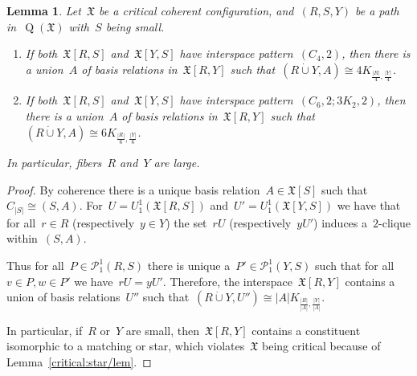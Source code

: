 \documentclass[english,a4paper]{article}
\theoremstyle{plain}
\newtheorem{lemma}      [theorem]{Lemma}
\theoremstyle{definition}
\newcommand{\abs}[1]{| #1 |}
\newcommand{\disjointUnion}{\ensuremath{\mathbin{\dot{\cup}}}}
\newcommand{\coherentConfig}{\ensuremath{\mathfrak{X}}}
\newcommand{\interspace}[2]{\ensuremath{\coherentConfig[#1,#2]}}
\newcommand{\inducedCC}[1]{\ensuremath{\coherentConfig[#1]}}
\newcommand{\arcs}{\ensuremath{A}}
\DeclareMathOperator*{\Quotient}{Q}
\newcommand{\quotientGraph}[1]{\ensuremath{\Quotient(#1)}}
\newcommand{\partition}[1]{\ensuremath{\mathcal{P}^1_1(#1)}}
\newcommand{\ipfourCycle}   {\ensuremath{(\cycle{4},2)}}
\newcommand{\ipsixMatchingAndCycle}     {\ensuremath{(\cycle{6},2;\disjointCliques{3}{2},2)}}
\newcommand{\clique}[1]{\ensuremath{K_{#1}}}
\newcommand{\cycle}[1]{\ensuremath{C_{#1}}}
\newcommand{\disjointCliques}[2]{\ensuremath{#1 \clique{#2}}}
\begin{document}
\begin{lemma}
    \label{critical:adjacent-interspace-cycle/lem}
    Let~$\coherentConfig$ be a critical coherent configuration, and~$(R,S,Y)$ be a path in~$\quotientGraph{\coherentConfig}$ with~$S$ being small.
    \begin{enumerate}
        \item If both~$\interspace{R}{S}$ and~$\interspace{Y}{S}$ have interspace pattern~$\ipfourCycle$, then there is a union~$\arcs$ of basis relations in~$\interspace{R}{Y}$ such that~$(R \disjointUnion Y,\arcs) \cong \disjointCliques{4}{\frac{\abs{R}}{4},\frac{\abs{Y}}{4}}$.
        \item If both~$\interspace{R}{S}$ and~$\interspace{Y}{S}$ have interspace pattern~$\ipsixMatchingAndCycle$, then there is a union~$\arcs$ of basis relations in~$\interspace{R}{Y}$ such that $(R \disjointUnion Y,\arcs) \cong \disjointCliques{6}{\frac{\abs{R}}{6},\frac{\abs{Y}}{6}}$.
    \end{enumerate}
    In particular, fibers~$R$ and~$Y$ are large.
\end{lemma}
\begin{proof}
    By coherence there is a unique basis relation~$\arcs \in \inducedCC{S}$ such that~$\cycle{\abs{S}} \cong (S,\arcs)$.
    For~$U = U^1_1(\interspace{R}{S})$ and~$U' = U^1_1( \interspace{Y}{S})$ we have that for all~$r \in R$ (respectively~$y \in Y$) the set~$r U$ (respectively~$y U'$) induces a~$2$-clique within~$(S,\arcs)$.

    Thus for all~$P \in \partition{R,S}$ there is unique a~$P' \in \partition{Y,S}$ such that for all~$v \in P, w \in P'$ we have~$r U = y U'$.
    Therefore, the interspace~$\interspace{R}{Y}$ contains a union of basis relations~$U''$ such that~$(R \disjointUnion Y, U'') \cong \disjointCliques{\abs{\arcs}}{\frac{\abs{R}}{\abs{\arcs}},\frac{\abs{Y}}{\abs{\arcs}}}$.

    In particular, if~$R$ or~$Y$ are small, then~$\interspace{R}{Y}$ contains a constituent isomorphic to a matching or star, which violates~$\coherentConfig$ being critical because of Lemma~\ref{critical:star/lem}.
\end{proof}
\end{document}
